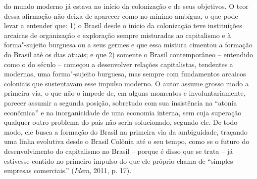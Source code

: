 {do mundo moderno já estava no início da colonização e de seus objetivos.
O teor dessa afirmação não deixa de aparecer como no mínimo ambígua, o
que pode levar a entender que: 1) o Brasil desde o início da colonização
teve instituições arcaicas de organização e exploração sempre misturadas
ao capitalismo e à forma"-sujeito burguesa ou a seus germes e que essa
mistura cimentou a formação do Brasil até os dias atuais; e que 2)
somente o Brasil contemporâneo -- entendido como o do século  --
começou a desenvolver relações capitalistas, tendentes a modernas, uma
forma"-sujeito burguesa, mas sempre com fundamentos arcaicos coloniais
que sustentavam esse impulso moderno. O autor assume grosso modo a
primeira via, o que não o impede de, em alguns momentos e
involuntariamente, parecer assumir a segunda posição, sobretudo com sua
insistência na ``atonia econômica'' e na inorganicidade de uma economia
interna, sem cuja superação qualquer outro problema do país não seria
solucionado, segundo ele. De todo modo, ele busca a formação do Brasil
na primeira via da ambiguidade, traçando uma linha evolutiva desde o
Brasil Colônia até o seu tempo, como se o futuro do desenvolvimento do
capitalismo no Brasil -- porque é disso que se trata -- já estivesse
contido no primeiro impulso do que ele próprio chama de ``simples
empresas comerciais.'' (\emph{Idem}, 2011, p. 17).

}
